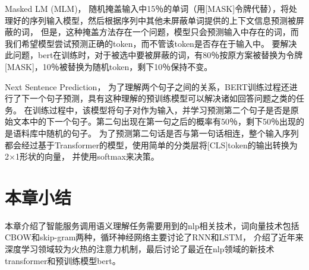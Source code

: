 Masked LM (MLM)，
随机掩盖输入中15％的单词（用[MASK]令牌代替），将处理好的序列输入模型，然后根据序列中其他未屏蔽单词提供的上下文信息预测被屏蔽的词，
但是，这种掩盖方法存在一个问题，模型只会预测输入中存在的词，而我们希望模型尝试预测正确的token，而不管该token是否存在于输入中。
要解决此问题，bert在训练时，对于被选中要被屏蔽的词，有80％按原方案被替换为令牌[MASK]，10％被替换为随机token，剩下10％保持不变。

Next Sentence Prediction，
为了理解两个句子之间的关系，BERT训练过程还进行了下一个句子预测，具有这种理解的预训练模型可以解决诸如回答问题之类的任务。
在训练过程中，该模型将句子对作为输入，并学习预测第二个句子是否是原始文本中的下一个句子。第二句出现在第一句之后的概率有50％，剩下50％出现的是语料库中随机的句子。
为了预测第二句话是否与第一句话相连，整个输入序列都会经过基于Transformer的模型，使用简单的分类层将[CLS]token的输出转换为2×1形状的向量，
并使用softmax来决策。

\section{本章小结}
本章介绍了智能服务调用语义理解任务需要用到的nlp相关技术，词向量技术包括CBOW和skip-gram两种，循环神经网络主要讨论了RNN和LSTM，
介绍了近年来深度学习领域较为火热的注意力机制，最后讨论了最近在nlp领域的新技术transformer和预训练模型bert。